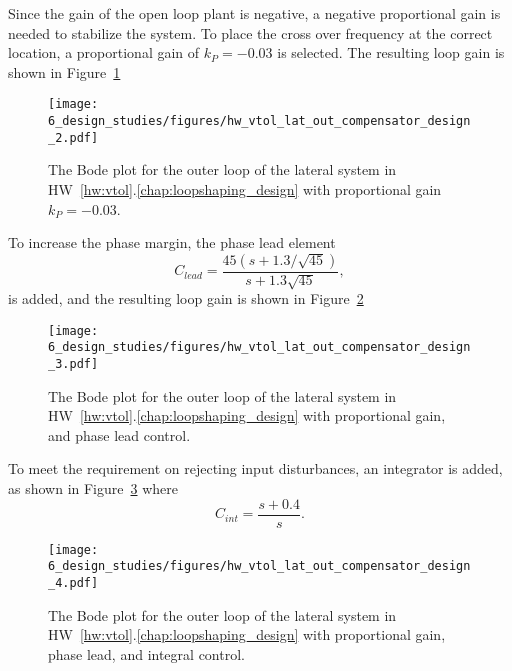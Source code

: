 Since the gain of the open loop plant is negative, a negative proportional gain is needed to stabilize the system.  To place the cross over frequency at the correct location, a proportional gain of $k_P = -0.03$ is selected.  The resulting loop gain is shown in Figure~\ref{fig:hw_vtol_lat_out_compensator_design_2}
\begin{figure}[H]
   \centering
   \texttt{[image: 6\_design\_studies/figures/hw\_vtol\_lat\_out\_compensator\_design\_2.pdf]}
   \caption{The Bode plot for the outer loop of the lateral system in HW~\ref{hw:vtol}.\ref{chap:loopshaping_design} with proportional gain $k_P=-0.03$.}
   \label{fig:hw_vtol_lat_out_compensator_design_2}
\end{figure}
To increase the phase margin, the phase lead element
\[
C_{lead} = \frac{45(s+1.3/\sqrt{45})}{s+1.3\sqrt{45}},
\]
is added, and the resulting loop gain is shown in Figure~\ref{fig:hw_vtol_lat_out_compensator_design_3}
\begin{figure}[H]
   \centering
   \texttt{[image: 6\_design\_studies/figures/hw\_vtol\_lat\_out\_compensator\_design\_3.pdf]}
   \caption{The Bode plot for the outer loop of the lateral system in HW~\ref{hw:vtol}.\ref{chap:loopshaping_design} with proportional gain, and phase lead control.}
   \label{fig:hw_vtol_lat_out_compensator_design_3}
\end{figure}
To meet the requirement on rejecting input disturbances, an integrator is added, as shown in Figure~\ref{fig:hw_vtol_lat_out_compensator_design_4} where
\[
C_{int} = \frac{s+0.4}{s}.
\]
\begin{figure}[H]
   \centering
   \texttt{[image: 6\_design\_studies/figures/hw\_vtol\_lat\_out\_compensator\_design\_4.pdf]}
   \caption{The Bode plot for the outer loop of the lateral system in HW~\ref{hw:vtol}.\ref{chap:loopshaping_design} with proportional gain, phase lead, and integral control.}
   \label{fig:hw_vtol_lat_out_compensator_design_4}
\end{figure}


